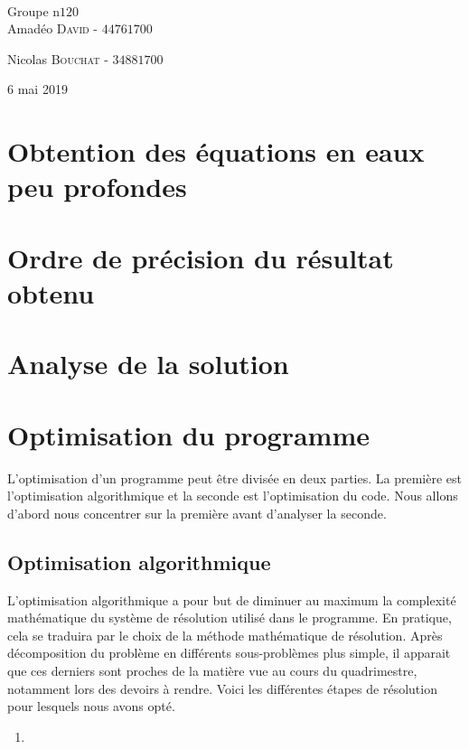 \documentclass{article}
\begin{document}
\begin{titlepage}
	\HRule\\[1.5cm]
	
	
	Groupe n\degree$120$\\[0.2cm]
	Amadéo \textsc{David}  - $4476 1700$%
	
	Nicolas \textsc{Bouchat} - $3488 1700$%
	
	
	\vfill\vfill\vfill %
	
	{\large 6 mai 2019} %
	
	
	\vfill %
	
\end{titlepage}
\section{Obtention des équations en eaux peu profondes}
\section{Ordre de précision du résultat obtenu}
\section{Analyse de la solution}
\section{Optimisation du programme}
	L'optimisation d'un programme peut être divisée en deux parties. 
	La première est l'optimisation algorithmique et la seconde est l'optimisation du code. 
	Nous allons d'abord nous concentrer sur la première avant d'analyser la seconde.
	\subsection{Optimisation algorithmique}
		L'optimisation algorithmique a pour but de diminuer au maximum la complexité mathématique du système de résolution utilisé dans le programme.
		En pratique, cela se traduira par le choix de la méthode mathématique de résolution.
		Après décomposition du problème en différents sous-problèmes plus simple, il apparait que ces derniers sont proches de la matière vue au cours du quadrimestre, notamment lors des devoirs à rendre.
		Voici les différentes étapes de résolution pour lesquels nous avons opté.
		\begin{enumerate}
			\item 
		\end{enumerate}
\end{document}
